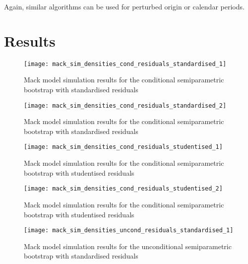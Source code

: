 \documentclass[a4paper]{book}
\begin{document}
Again, similar algorithms can be used for perturbed origin or calendar periods.

\section{Results}


\begin{landscape}
  \begin{figure}
    \centering
    \texttt{[image: mack\_sim\_densities\_cond\_residuals\_standardised\_1]}
    \caption{Mack model simulation results for the conditional semiparametric bootstrap with standardised residuals}
    \label{fig:sim-res}
  \end{figure}
\end{landscape}

\begin{landscape}
  \begin{figure}
    \ContinuedFloat
    \captionsetup{list=off,format=cont}
    \centering
    \texttt{[image: mack\_sim\_densities\_cond\_residuals\_standardised\_2]}
    \caption{Mack model simulation results for the conditional semiparametric bootstrap with standardised residuals}
    \label{fig:sim-res}
  \end{figure}
\end{landscape}

\begin{landscape}
  \begin{figure}
    \centering
    \texttt{[image: mack\_sim\_densities\_cond\_residuals\_studentised\_1]}
    \caption{Mack model simulation results for the conditional semiparametric bootstrap with studentised residuals}
    \label{fig:sim-res}
  \end{figure}
\end{landscape}

\begin{landscape}
  \begin{figure}
    \ContinuedFloat
    \captionsetup{list=off,format=cont}
    \centering
    \texttt{[image: mack\_sim\_densities\_cond\_residuals\_studentised\_2]}
    \caption{Mack model simulation results for the conditional semiparametric bootstrap with studentised residuals}
    \label{fig:sim-res}
  \end{figure}
\end{landscape}

\begin{landscape}
  \begin{figure}
    \centering
    \texttt{[image: mack\_sim\_densities\_uncond\_residuals\_standardised\_1]}
    \caption{Mack model simulation results for the unconditional semiparametric bootstrap with standardised residuals}
    \label{fig:sim-res}
  \end{figure}
\end{landscape}
\end{document}
